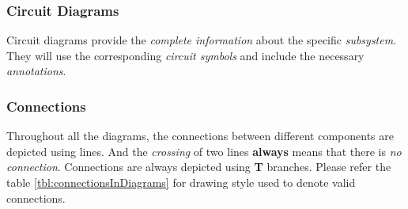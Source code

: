 \documentclass[../../main]{subfiles}
\begin{document}
\subsubsection{Circuit Diagrams}

Circuit diagrams provide the \emph{complete information} about the specific \emph{subsystem}.
They will use the corresponding \emph{circuit symbols} and include the necessary \emph{annotations}.

\subsubsection{Connections}

Throughout all the diagrams, the connections between different components are depicted using
lines. And the \emph{crossing} of two lines \textbf{always} means that there is \emph{no connection}.
Connections are always depicted using \textbf{T} branches. Please refer the table \ref{tbl:connectionsInDiagrams}
for drawing style used to denote valid connections.

\end{document}
